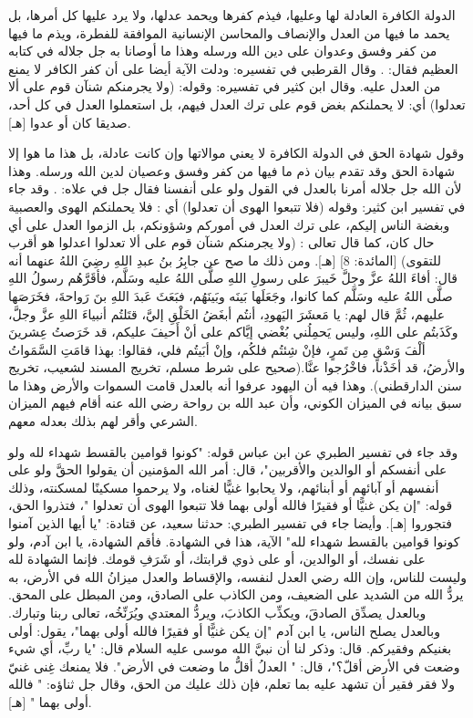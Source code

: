 الدولة الكافرة العادلة لها وعليها، فيذم كفرها ويحمد عدلها، ولا يرد عليها كل أمرها، بل يحمد ما فيها من العدل والإنصاف والمحاسن الإنسانية الموافقة للفطرة، ويذم ما فيها من كفر وفسق وعدوان على دين الله ورسله وهذا ما أوصانا به جل جلاله في كتابه العظيم فقال: 
\quranayah*[5][8]{\footnotesize \surahname*[5]}. وقال القرطبي في تفسيره: ودلت الآية أيضا على أن كفر الكافر لا يمنع من العدل عليه. وقال ابن كثير في تفسيره: وقوله: (ولا يجرمنكم شنآن قوم على ألا تعدلوا) أي: لا يحملنكم بغض قوم على ترك العدل فيهم، بل استعملوا العدل في كل أحد، صديقا كان أو عدوا [هـ]. 


وقول شهادة الحق في الدولة الكافرة لا يعني موالاتها وإن كانت عادلة، بل هذا ما هوا إلا شهادة الحق وقد تقدم بيان ذم ما فيها من كفر وفسق وعصيان لدين الله ورسله. وهذا لأن الله جل جلاله أمرنا بالعدل في القول ولو على أنفسنا فقال جل في علاه:
\quranayah*[4][135]{\footnotesize \surahname*[4]}. وقد جاء في تفسير ابن كثير: وقوله (فلا تتبعوا الهوى أن تعدلوا) أي : فلا يحملنكم الهوى والعصبية وبغضة الناس إليكم، على ترك العدل في أموركم وشؤونكم، بل الزموا العدل على أي حال كان، كما قال تعالى : (ولا يجرمنكم شنآن قوم على ألا تعدلوا اعدلوا هو أقرب للتقوى) [المائدة: 8] [هـ]. ومن ذلك ما صح عن جابِرُ بنُ عبدِ اللهِ رضِيَ اللهُ عنهما أنه قال: أفاءَ اللهُ عزَّ وجلَّ خَيبرَ على رسولِ اللهِ صلَّى اللهُ عليه وسَلَّم، فأقَرَّهُم رسولُ اللهِ صلَّى اللهُ عليه وسَلَّم كما كانوا، وجَعَلَها بَينَه وبَينَهُم، فبَعَثَ عَبدَ اللهِ بنَ رَواحةَ، فخَرَصَها عليهم، ثُمَّ قال لهم: يا مَعشَرَ اليَهودِ، أنتُم أبغَضُ الخَلْقِ إليَّ، قتَلتُم أنبياءَ اللهِ عزَّ وجلَّ، وكَذَبتُم على اللهِ، وليس يَحمِلُني بُغْضي إيَّاكم على أنْ أَحيفَ عليكم، قد خَرَصتُ عِشرينَ ألْفَ وَسْقٍ مِن تَمرٍ، فإنْ شِئتُم فلكُم، وإنْ أبَيتُم فلي، فقالوا: بهذا قامَتِ السَّمَواتُ والأرضُ، قد أخَذْنا، فاخْرُجوا عنَّا.{\footnotesize (صحيح على شرط مسلم، تخريج المسند لشعيب، تخريج سنن الدارقطني)}. وهذا فيه أن اليهود عرفوا أنه بالعدل قامت السموات والأرض وهذا ما سبق بيانه في الميزان الكوني، وأن عبد الله بن رواحة رضي الله عنه أقام فيهم الميزان الشرعي وأقر لهم بذلك بعدله معهم. 

وقد جاء في تفسير الطبري عن ابن عباس قوله: "كونوا قوامين بالقسط شهداء لله ولو على أنفسكم أو الوالدين والأقربين"، قال: أمر الله المؤمنين أن يقولوا الحقَّ ولو على أنفسهم أو آبائهم أو أبنائهم، ولا يحابوا غنيًّا لغناه، ولا يرحموا مسكينًا لمسكنته، وذلك قوله: "إن يكن غنيًّا أو فقيرًا فالله أولى بهما فلا تتبعوا الهوى أن تعدلوا "، فتذروا الحق، فتجوروا [هـ]. وأيضا جاء في تفسير الطبري: حدثنا سعيد، عن قتادة: "يا أيها الذين آمنوا كونوا قوامين بالقسط شهداء لله" الآية، هذا في الشهادة. فأقم الشهادة، يا ابن آدم، ولو على نفسك، أو الوالدين، أو على ذوي قرابتك، أو شَرَفِ قومك. فإنما الشهادة لله وليست للناس، وإن الله رضي العدل لنفسه، والإقساط والعدل ميزانُ الله في الأرض، به يردُّ الله من الشديد على الضعيف، ومن الكاذب على الصادق، ومن المبطل على المحق. وبالعدل يصدِّق الصادقَ، ويكذِّب الكاذبَ، ويردُّ المعتدي ويُرَنِّخُه، تعالى ربنا وتبارك. وبالعدل يصلح الناس، يا ابن آدم "إن يكن غنيًّا أو فقيرًا فالله أولى بهما"، يقول: أولى بغنيكم وفقيركم. قال: وذكر لنا أن نبيَّ الله موسى عليه السلام قال: "يا ربِّ، أي شيء وضعت في الأرض أقلّ؟"، قال: " العدلُ أقلُّ ما وضعت في الأرض". فلا يمنعك غِنى غنيّ ولا فقر فقير أن تشهد عليه بما تعلم، فإن ذلك عليك من الحق، وقال جل ثناؤه: " فالله أولى بهما " [هـ].


